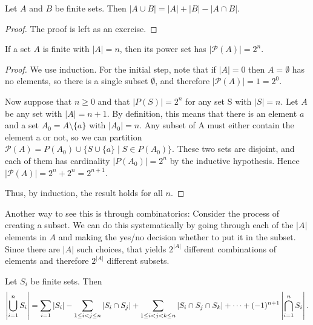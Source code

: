 \begin{proposition}
Let $A$ and $B$ be finite sets. Then $|A \cup B| = |A| + |B| - |A \cap B|$.
\end{proposition}

\begin{proof}
The proof is left as an exercise.
\end{proof}

\begin{proposition}
If a set $A$ is finite with $|A| = n$, then its power set has $|\mathcal{P}(A)| = 2^n$.
\end{proposition}

\begin{proof}
We use induction. For the initial step, note that if $|A| = 0$ then $A = \emptyset$ has no elements, so there is a single subset $\emptyset$, and therefore $|\mathcal{P}(A)| = 1 = 2^0$.

Now suppose that $n \ge 0$ and that $|P(S)| = 2^n$ for any set S with $|S| = n$. Let $A$ be any set with $|A| = n+1$. By definition, this means that there is an element $a$ and a set $A_0 = A\setminus\{a\}$ with $|A_0| = n$. Any subset of A must either contain the element a or not, so we can partition $\mathcal{P}(A) = P(A_0) \cup \{S \cup \{a\} \mid S \in P(A_0)\}$. These two sets are disjoint, and each of them has cardinality $|P(A_0)| = 2^n$ by the inductive hypothesis. Hence $|\mathcal{P}(A)| = 2^n + 2^n = 2^{n+1}$.

Thus, by induction, the result holds for all $n$.
\end{proof}

Another way to see this is through combinatorics: Consider the process of creating a subset. We can do this systematically by going through each of the $|A|$ elements in $A$ and making the yes/no decision whether to put it in the subset. Since there are $|A|$ such choices, that yields $2^{|A|}$ different combinations of elements and therefore $2^{|A|}$ different subsets.


\begin{theorem}
Let $S_i$ be finite sets. Then
\begin{equation}
\left|\bigcup_{i=1}^nS_i\right|=\sum_{i=1}|S_i|-\sum_{1\le i<j\le n}|S_i\cap S_j|+\sum_{1\le i<j<k\le n}|S_i\cap S_j\cap S_k|+\cdots+(-1)^{n+1}\left|\bigcap_{i=1}^nS_i\right|.
\end{equation}
\end{theorem}


